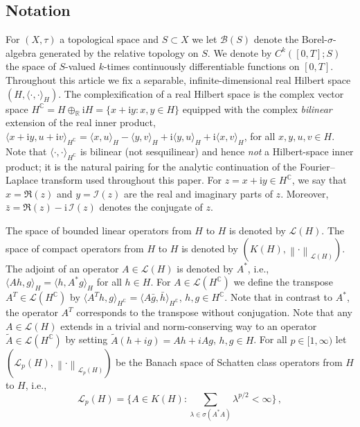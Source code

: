\documentclass[10pt,a4paper,reqno]{amsart}
\numberwithin{equation}{section}
\theoremstyle{plain}
\theoremstyle{definition}
\theoremstyle{example}
\renewcommand{\MR}{\mathbb{R}}
\newcommand{\R}{\MR}
\newcommand{\cB}{\mathcal{B}}
\newcommand{\cL}{\mathcal{L}}
\begin{document}
\subsection{Notation}
For $(X,\tau)$ a topological space and $S \subset X$ we let $\cB(S)$ denote the Borel-$\sigma$-algebra generated by the relative topology on $S$. We denote by $C^k([0,T];S)$ the space of $S$-valued $k$-times continuously differentiable functions on $[0,T]$. Throughout this article we fix a separable, infinite-dimensional real Hilbert space $(H,\langle\cdot,\cdot \rangle_H)$. The complexification of a real Hilbert space is the complex vector space $H^{\mathbb{C}}= H\oplus_\R \mathrm{i} H=\{x+\mathrm{i}y \colon x,y \in H\}$ equipped with the complex \emph{bilinear} extension of the real inner product,
$\langle x+\mathrm{i}y, u+\mathrm{i} v\rangle_{H^{\mathbb{C}}} = \langle x,u \rangle_{H}-\langle y,v\rangle_{H}+\mathrm{i}\langle y,u \rangle_{H}+\mathrm{i}\langle x, v\rangle_{H}$, for all $x,y,u,v \in H$. Note that $\langle\cdot,\cdot\rangle_{H^{\mathbb{C}}}$ is bilinear (not sesquilinear) and hence \emph{not} a Hilbert-space inner product; it is the natural pairing for the analytic continuation of the Fourier--Laplace transform used throughout this paper. For $z =x+\mathrm{i} y \in H^{\mathbb{C}}$, we say that $x=\Re(z)$ and $y=\mathcal{I}(z)$ are the real and imaginary parts of $z$. Moreover, $\bar{z}=\Re(z)- \mathrm{i} \,\mathcal{I}(z)$ 
denotes the conjugate of $z$. \par
The space of bounded linear operators from $H$ to $H$ is denoted by $\cL(H)$. The space of compact operators from $H$ to $H$ is denoted by $(K(H),\left\| \cdot \right\|_{\cL(H)})$. The adjoint of an
operator $A \in \cL(H)$ is denoted by $A^*$, i.e.,  $\langle Ah,g\rangle_{H} = \langle h, A^*g\rangle_{H}$ for all $h\in H$.
For $A\in \cL(H^{\mathbb{C}})$
we define the transpose $A^T\in \cL(H^{\mathbb{C}})$
by $\langle A^T h, g\rangle_{H^{\mathbb{C}}} = \langle A \bar{g}, \bar{h} \rangle_{H^{\mathbb{C}}}$, $h,g\in H^{\mathbb{C}}$. Note that in contrast to $A^*$, the operator $A^{T}$ corresponds to the transpose without conjugation.
Note that any $A\in \cL(H)$ extends in a trivial and norm-conserving way to an operator $\tilde{A}\in \cL(H^{\mathbb{C}})$ by setting $\tilde{A}(h + ig)=Ah+iAg$, $h,g\in H$. For all $p\in [1,\infty)$ let 
$(\cL_{p}(H), \left\| \cdot \right\|_{\cL_p(H)})$ be the Banach space of Schatten class operators from $H$ to $H$, i.e.,
\begin{equation}
 \cL_{p}(H) = \Big\{ A \in K(H) \colon \sum_{\lambda \in \sigma(A^*A)} \lambda^{p/2} < \infty \Big\}\,,
\end{equation}
\end{document}
